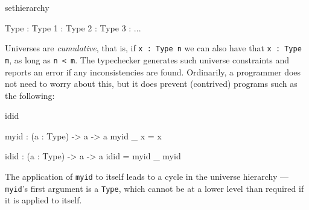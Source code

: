 \begin{SaveVerbatim}{sethierarchy}

Type : Type 1 : Type 2 : Type 3 : ...

\end{SaveVerbatim}

\noindent
Universes are \emph{cumulative}, that is, if \texttt{x : Type n} we can also have that
\texttt{x : Type m}, as long as \texttt{n < m}. 
The typechecker generates such universe 
constraints and reports an error if any inconsistencies are found. Ordinarily, a
programmer does not need to worry about this, but it does prevent (contrived)
programs such as the following:

\begin{SaveVerbatim}{idid}

myid : (a : Type) -> a -> a
myid _ x = x

idid :  (a : Type) -> a -> a
idid = myid _ myid

\end{SaveVerbatim}

\noindent
The application of \texttt{myid} to itself leads to a cycle in the universe hierarchy
--- \texttt{myid}'s first argument is a \texttt{Type}, which cannot be at a lower level
than required if it is applied to itself.


